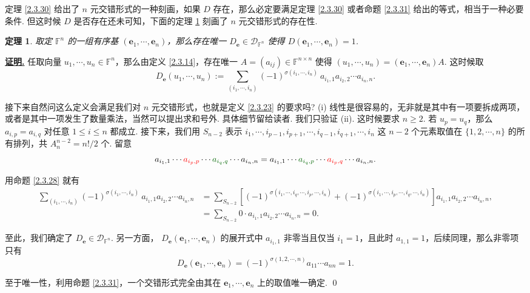 \documentclass[10pt,openany]{article}
\theoremstyle{thmstyle} %
\newtheorem{theorem}{定理}[subsection]
\theoremstyle{defstyle} %
\theoremstyle{prostyle} %
\theoremstyle{exastyle}
\theoremstyle{remstyle}
\renewenvironment{proof}[1][证明]{\par\underline{\textbf{#1.}} \;\fangsong}{\qed\par}
\newcommand{\F}{\mathbb{F}}
\newcommand{\n}{^{n \times n}}
\newcommand{\bme}{\bm{e}}
\begin{document}
定理 \ref{2.3.30} 给出了 \( n \) 元交错形式的一种刻画，如果 \( D \) 存在，那么必定要满足定理 \ref{2.3.30} 或者命题 \ref{2.3.31} 给出的等式，相当于一种必要条件. 但这时候 \( D \) 是否存在还未可知，下面的定理 \ref{2.3.32} 刻画了 \( n \) 元交错形式的存在性.

\begin{theorem} \label{2.3.32}
	取定 \( \F^n \) 的一组有序基 \( (\bme_1,\cdots,\bme_n) \)，那么存在唯一 \( D_{\bm{e}} \in \mathcal{D}_{\F^n} \) 使得 \( D(\bme_1,\cdots,\bme_n)=1 \).
\end{theorem}

\begin{proof}
	任取向量 \( u_1,\cdots,u_n \in \F^n \)，那么由定义 \ref{2.3.14}，存在唯一 \( A=(a_{ij}) \in \F\n \) 使得 \( (u_1,\cdots,u_n)=(\bme_1,\cdots,\bme_n)A \). 这时候取
	\[ D_{\bm{e}}(u_1,\cdots,u_n):=\sum_{(i_1,\cdots,i_n)}^{} (-1)^{\sigma(i_1,\cdots,i_n)} \ a_{i_1,1}a_{i_2,2}\cdots a_{i_n,n}. \]
	
	接下来自然问这么定义会满足我们对 \( n \) 元交错形式，也就是定义 \ref{2.3.23} 的要求吗? (i) 线性是很容易的，无非就是其中有一项要拆成两项，或者是其中一项发生了数量乘法，当然可以提出求和号外. 具体细节留给读者. 我们只验证 (ii). 这时候要求 \( n \geq 2 \). 若 \( u_p=u_q \)，那么 \( a_{i,p}=a_{i,q} \) 对任意 \( 1 \leq i \leq n \) 都成立. 接下来，我们用 \( S_{n-2} \) 表示 \( i_1,\cdots,i_{p-1},i_{p+1},\cdots,i_{q-1},i_{q+1},\cdots,i_n \) 这 \( n-2 \) 个元素取值在 \( \{1,2,\cdots,n\} \) 的所有排列，共 \( A_{n}^{n-2}=n!/2 \) 个. 留意
	\[ a_{i_1,1}\cdots {\color{red}a_{i_p,p}} \cdots {\color{green!40!black} a_{i_q,q}} \cdots a_{i_n,n}= a_{i_1,1}\cdots {\color{green!40!black}a_{i_q,p}} \cdots { \color{red} a_{i_p,q}} \cdots a_{i_n,n}. \]
	
	用命题 \ref{2.3.28} 就有
	\begin{align*}
		\sum_{(i_1,\cdots,i_n)}^{} (-1)^{\sigma(i_1,\cdots,i_n)} \ a_{i_1,1}a_{i_2,2}\cdots a_{i_n,n} &=\sum_{S_{n-2}}^{} [(-1)^{\sigma(i_1,\cdots,i_q,\cdots,i_p,\cdots,i_n)}+ (-1)^{\sigma(i_1,\cdots,i_p,\cdots,i_q,\cdots,i_n)}] a_{i_1,1}a_{i_2,2}\cdots a_{i_n,n}, \\
		&=\sum_{S_{n-2}}^{} 0 \cdot a_{i_1,1}a_{i_2,2}\cdots a_{i_n,n}=0. 
	\end{align*}
	
	至此，我们确定了 \(D_{\bm{e}} \in \mathcal{D}_{\F^n} \). 另一方面， \( D_{\bm{e}}(\bme_1,\cdots,\bme_n) \) 的展开式中 \( a_{i_1,1} \) 非零当且仅当 \( i_1=1 \)，且此时 \( a_{1,1}=1 \)，后续同理，那么非零项只有
	\[ D_{\bm{e}}(\bme_1,\cdots,\bme_n)=(-1)^{\sigma(1,2,\cdots,n)} a_{11}\cdots a_{nn}=1. \]
	
	至于唯一性，利用命题 \ref{2.3.31}，一个交错形式完全由其在 \( \bme_1,\cdots,\bme_n \) 上的取值唯一确定.
\end{proof}
\end{document}
